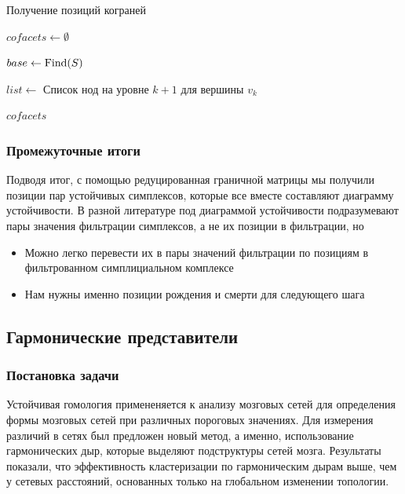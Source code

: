\documentclass{article}
\begin{document}
\begin{algorithm}[H]
\caption{Получение позиций кограней}
$cofacets \gets \emptyset$


$base \gets \mathop{\rm Find}(S)$



$list \gets $ Список нод на уровне $k+1$ для вершины $v_k$

 {
}

\Return $cofacets$
\end{algorithm}

\subsubsection{Промежуточные итоги}
Подводя итог, с помощью редуцированная граничной матрицы мы получили позиции пар устойчивых симплексов, которые все вместе составляют диаграмму устойчивости. В разной литературе под диаграммой устойчивости подразумевают пары значения фильтрации симплексов, а не их позиции в фильтрации, но
\begin{itemize}
  \item Можно легко перевести их в пары значений фильтрации по позициям в фильтрованном симплициальном комплексе
  \item Нам нужны именно позиции рождения и смерти для следующего шага
\end{itemize}
\subsection{Гармонические представители}
\subsubsection{Постановка задачи}
Устойчивая гомология примененяется к анализу мозговых сетей для определения формы мозговых сетей при различных пороговых значениях. Для измерения различий в сетях был предложен новый метод, а именно, использование гармонических дыр, которые выделяют подструктуры сетей мозга. Результаты показали, что эффективность кластеризации по гармоническим дырам выше, чем у сетевых расстояний, основанных только на глобальном изменении топологии.
\end{document}
